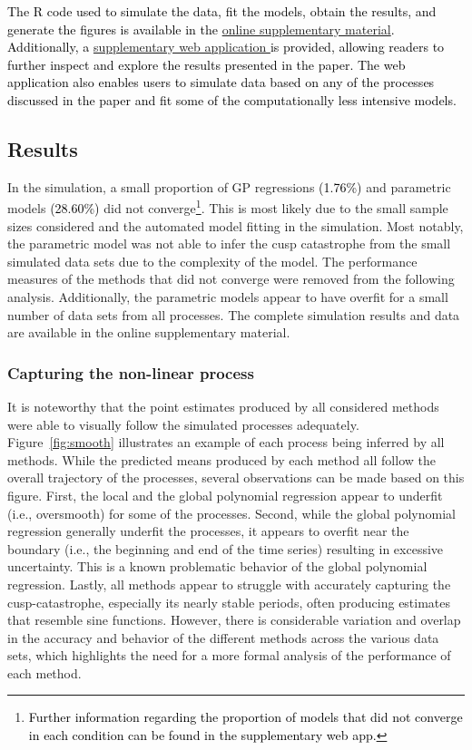 \documentclass[man, floatsintext]{apa7}
\begin{document}
\textcolor{black}{
  The R code used to simulate the data, fit the models, obtain
  the results, and generate the figures is available in the
  \href{https://osf.io/3ytdx/}{online supplementary material}. Additionally, a
  \href{https://jan-ian-failenschmid.shinyapps.io/modeling_non_linearity_app/}{
    supplementary web application } is provided, allowing readers to further
  inspect and explore the results presented in the paper. The web application
  also enables users to simulate data based on any of the processes discussed
  in
  the paper and fit some of the computationally less intensive models.
}

\subsection{Results}

In the simulation, a small proportion of GP regressions
\textcolor{black}{(1.76\%)} and parametric models \textcolor{black}{(28.60\%)}
did not converge\footnote{\textcolor{black}{Further information regarding the
    proportion of models that did not converge in each condition can be found
    in the supplementary web app.}}. This is most likely due to the small
sample
sizes considered
and the automated model fitting in the simulation. Most notably, the parametric
model was not able to infer the cusp catastrophe from the small simulated data
sets due to the complexity of the model. The performance measures of the
methods that did not converge were removed from the following analysis.
Additionally, the parametric models appear to have overfit for a small number
of data sets from all processes. The complete simulation results and data are
available in the online supplementary material.

\subsubsection{Capturing the non-linear process}

It is noteworthy that the point estimates produced by all considered methods
were able to visually follow the simulated processes adequately.
Figure~\ref{fig:smooth} illustrates an example of each process being inferred
by all methods. While the predicted means produced by each method all follow
the overall trajectory of the processes, several observations can be made based
on this figure. First, the local and the global polynomial regression appear to
underfit (i.e., oversmooth) for some of the processes. Second, while the global
polynomial regression generally underfit the processes, it appears to overfit
near the boundary (i.e., the beginning and end of the time series) resulting in
excessive uncertainty. This is a known problematic behavior of the global
polynomial regression. Lastly, all methods appear to struggle with accurately
capturing the cusp-catastrophe, especially its nearly stable periods, often
producing estimates that resemble sine functions. However, there is
considerable variation and overlap in the accuracy and behavior of the
different methods across the various data sets, which highlights the need for a
more formal analysis of the performance of each method.
\end{document}
